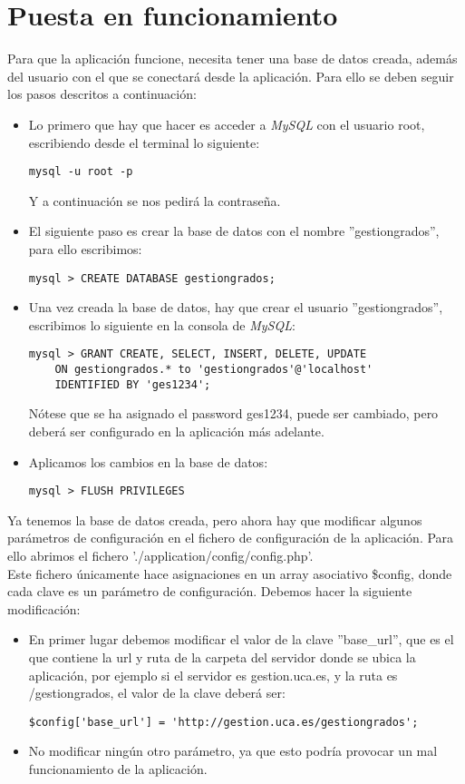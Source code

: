 \section{Puesta en funcionamiento}
Para que la aplicación funcione, necesita tener una base de datos creada, además del usuario con el que se conectará desde la aplicación. Para ello se deben seguir los pasos descritos a continuación:
\begin{itemize}
\item Lo primero que hay que hacer es acceder a {\em MySQL} con el usuario root, escribiendo desde el terminal lo siguiente:
\begin{lstlisting}[style=consola]
	mysql -u root -p
\end{lstlisting}
Y a continuación se nos pedirá la contraseña.
\item El siguiente paso es crear la base de datos con el nombre ''gestiongrados'', para ello escribimos:
\begin{lstlisting}[style=consola]
	mysql > CREATE DATABASE gestiongrados;
\end{lstlisting}
\item Una vez creada la base de datos, hay que crear el usuario ''gestiongrados'', escribimos lo siguiente en la consola de {\em MySQL}:
\begin{lstlisting}[style=consola]
	mysql > GRANT CREATE, SELECT, INSERT, DELETE, UPDATE 
	ON gestiongrados.* to 'gestiongrados'@'localhost' 
	IDENTIFIED BY 'ges1234';
\end{lstlisting}
Nótese que se ha asignado el password ges1234, puede ser cambiado, pero deberá ser configurado en la aplicación más adelante.
\item Aplicamos los cambios en la base de datos:
\begin{lstlisting}[style=consola]
	mysql > FLUSH PRIVILEGES
\end{lstlisting}
\end{itemize}

Ya tenemos la base de datos creada, pero ahora hay que modificar algunos parámetros de configuración en el fichero de configuración de la aplicación. Para ello abrimos el fichero './application/config/config.php'.\\
Este fichero únicamente hace asignaciones en un array asociativo \$config, donde cada clave es un parámetro de configuración. Debemos hacer la siguiente modificación:

\begin{itemize}
\item En primer lugar debemos modificar el valor de la clave ''base\_url'', que es el que contiene la url y ruta de la carpeta del servidor donde se ubica la aplicación, por ejemplo si el servidor es gestion.uca.es, y la ruta es /gestiongrados, el valor de la clave deberá ser:
\begin{lstlisting}[style=PHP]
$config['base_url'] = 'http://gestion.uca.es/gestiongrados';
\end{lstlisting}
\item No modificar ningún otro parámetro, ya que esto podría provocar un mal funcionamiento de la aplicación.
\end{itemize}

